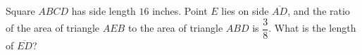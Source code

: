 Square $ABCD$ has side length $16$ inches. Point $E$ lies on side $\overline{AD}$, and the ratio of the area of triangle $AEB$ to the area of triangle $ABD$ is $\dfrac38$. What is the length of $\overline{ED}$?
